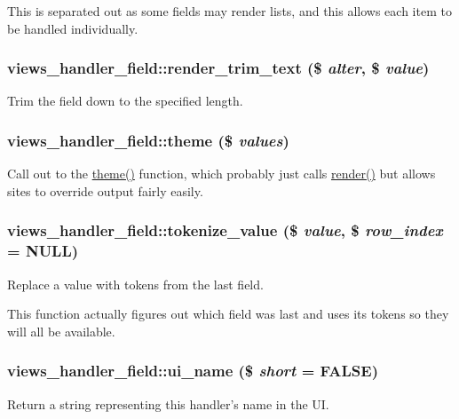 This is separated out as some fields may render lists, and this allows each item to be handled individually. \hypertarget{classviews__handler__field_aa2c5f49595a97848d523338a5c64a7c6}{
\subsubsection[{render\_\-trim\_\-text}]{\setlength{\rightskip}{0pt plus 5cm}views\_\-handler\_\-field::render\_\-trim\_\-text (\$ {\em alter}, \/  \$ {\em value})}}
\label{classviews__handler__field_aa2c5f49595a97848d523338a5c64a7c6}
Trim the field down to the specified length. \hypertarget{classviews__handler__field_a31b777437d94e4904c546e3bb0d76c16}{
\subsubsection[{theme}]{\setlength{\rightskip}{0pt plus 5cm}views\_\-handler\_\-field::theme (\$ {\em values})}}
\label{classviews__handler__field_a31b777437d94e4904c546e3bb0d76c16}
Call out to the \hyperlink{classviews__handler__field_a31b777437d94e4904c546e3bb0d76c16}{theme()} function, which probably just calls \hyperlink{classviews__handler__field_a82ff951c5e9ceb97b2eab86f880cbc1e}{render()} but allows sites to override output fairly easily. \hypertarget{classviews__handler__field_a81a30c2236091a1998399fe7ee416d7f}{
\subsubsection[{tokenize\_\-value}]{\setlength{\rightskip}{0pt plus 5cm}views\_\-handler\_\-field::tokenize\_\-value (\$ {\em value}, \/  \$ {\em row\_\-index} = {\ttfamily NULL})}}
\label{classviews__handler__field_a81a30c2236091a1998399fe7ee416d7f}
Replace a value with tokens from the last field.

This function actually figures out which field was last and uses its tokens so they will all be available. \hypertarget{classviews__handler__field_a593c70c519615b5be3b5cd43cd1b663b}{
\subsubsection[{ui\_\-name}]{\setlength{\rightskip}{0pt plus 5cm}views\_\-handler\_\-field::ui\_\-name (\$ {\em short} = {\ttfamily FALSE})}}
\label{classviews__handler__field_a593c70c519615b5be3b5cd43cd1b663b}
Return a string representing this handler's name in the UI. 

